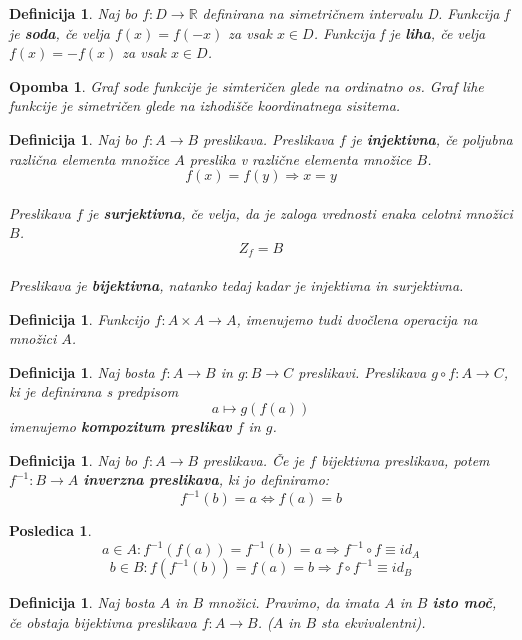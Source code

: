 \documentclass[11pt]{article}
\newtheorem{Posledica}[Izrek]{{\sc Posledica}}
\newtheorem{Definicija}[Izrek]{{\sc Definicija}}
\newtheorem{Opomba}[Izrek]{{\sc Opomba}}
\begin{document}
\begin{Definicija}
	Naj bo $f: D\to \mathbb{R}$ definirana na simetričnem intervalu D.
	\newline
	Funkcija f je  \textbf{soda}, če velja $f(x) = f(-x)$ za vsak $x \in D$.
	\newline
	Funkcija f je \textbf{liha}, če velja $f(x) = -f(x)$ za vsak $x \in D$.
\end{Definicija}
\begin{Opomba}
	Graf sode funkcije je simteričen glede na ordinatno os.
	\newline
	Graf lihe funkcije je simetričen glede na izhodišče koordinatnega sisitema.
\end{Opomba}
\begin{Definicija}
	Naj bo $f: A \to B$ preslikava. Preslikava $f$ je \textbf{injektivna}, če poljubna različna elementa množice $A$ preslika v različne elementa množice $B$.
	$$f(x) = f(y) \Rightarrow x = y$$
	\\
	Preslikava $f$ je \textbf{surjektivna}, če velja, da je zaloga vrednosti enaka celotni množici $B$. 
	$$Z_f = B$$	
	\\
	Preslikava je \textbf{bijektivna}, natanko tedaj kadar je injektivna in surjektivna.
\end{Definicija}
\begin{Definicija}
	Funkcijo $f: A \times A \to A$, imenujemo tudi dvočlena operacija na množici $A$.
\end{Definicija}
\begin{Definicija}
		Naj bosta $f: A \to B$ in $g: B\to C$ preslikavi. Preslikava $g \circ f: A \to C$, ki je definirana s predpisom
		$$ a \mapsto g(f(a))$$
		imenujemo \textbf{kompozitum preslikav} $f$ in $g$.
\end{Definicija}
\begin{Definicija}
	Naj bo $f: A \to B$ preslikava. Če je $f$ bijektivna preslikava, potem $f^{-1}: B\to A$  \textbf{inverzna preslikava}, ki jo definiramo:
	$$f^{-1}(b) = a \iff f(a) = b$$
\end{Definicija}
\begin{Posledica}
		$$a\in A :  f^{-1}(f(a)) = f^{-1}(b) = a \Rightarrow f^{-1} \circ f \equiv id_A$$
		$$b\in B :  f(f^{-1}(b)) = f(a) = b  \Rightarrow f \circ f^{-1} \equiv id_B$$
\end{Posledica}
\begin{Definicija}
	Naj bosta $A$ in $B$ množici. Pravimo, da imata $A$ in $B$ \textbf{isto moč}, če obstaja bijektivna preslikava $f: A \to B$. ($A$ in $B$ sta ekvivalentni).
\end{Definicija}
\end{document}
